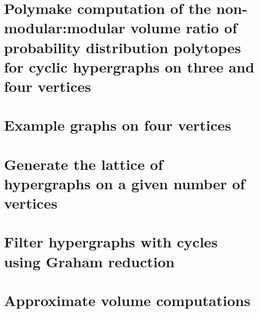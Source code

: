 \FloatBarrier

\section*{Polymake computation of the non-modular:modular volume ratio of probability distribution polytopes for cyclic hypergraphs on three and four vertices}

\pagebreak

\section*{Example graphs on four vertices}

\pagebreak

\section*{Generate the lattice of hypergraphs on a given number of vertices}

\pagebreak

\section*{Filter hypergraphs with cycles using Graham reduction}

\pagebreak

\section*{Approximate volume computations}



